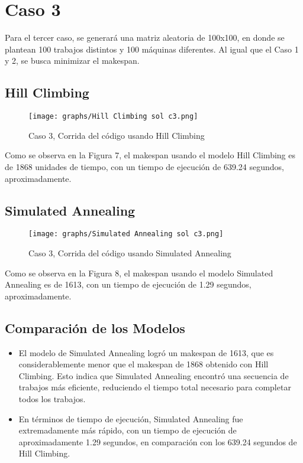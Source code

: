 \documentclass[11pt]{article}
\begin{document}
\section{Caso 3}
Para el tercer caso, se generará una matriz aleatoria de 100x100, en donde se plantean 100 trabajos distintos y 100 máquinas diferentes. Al igual que el Caso 1 y 2, se busca minimizar el makespan. 

\subsection{Hill Climbing}
\begin{figure}[H]
  \centering
  \texttt{[image: graphs/Hill Climbing sol c3.png]}
  \caption{Caso 3, Corrida del código usando Hill Climbing}
  \label{fig:miImagen}
\end{figure}

\noindent Como se observa en la Figura 7, el makespan usando el modelo Hill Climbing es de 1868 unidades de tiempo, con un tiempo de ejecución de 639.24 segundos, aproximadamente.

\subsection{Simulated Annealing}
\begin{figure}[H]
  \centering
  \texttt{[image: graphs/Simulated Annealing sol c3.png]}
  \caption{Caso 3, Corrida del código usando Simulated Annealing}
  \label{fig:miImagen}
\end{figure}

\noindent Como se observa en la Figura 8, el makespan usando el modelo Simulated Annealing es de 1613, con un tiempo de ejecución de 1.29 segundos, aproximadamente.

\subsection{Comparación de los Modelos} 
\begin{itemize}
\item El modelo de Simulated Annealing logró un makespan de 1613, que es considerablemente menor que el makespan de 1868 obtenido con Hill Climbing. Esto indica que Simulated Annealing encontró una secuencia de trabajos más eficiente, reduciendo el tiempo total necesario para completar todos los trabajos.
\item En términos de tiempo de ejecución, Simulated Annealing fue extremadamente más rápido, con un tiempo de ejecución de aproximadamente 1.29 segundos, en comparación con los 639.24 segundos de Hill Climbing.
\end{itemize}
\end{document}
